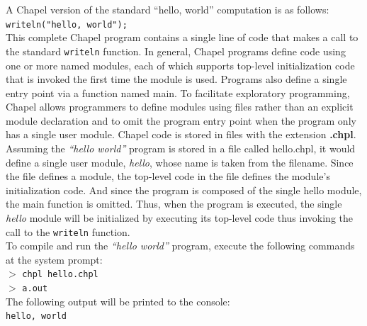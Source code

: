 \documentclass[letterpaper]{article}
\begin{document}
A Chapel version of the standard “hello, world” computation is as follows:\\

\texttt{writeln("hello, world");}\\

This complete Chapel program contains a single line of code that makes a call to the standard
\texttt{writeln} function. In general, Chapel programs define code using one or more named
modules, each of which supports top-level initialization code that is invoked the first time the module is used. Programs also define a single entry point via a function named main. To facilitate exploratory programming, Chapel allows programmers to define modules using files rather than an explicit module declaration and to omit the program entry point when the program only has a single user
module. Chapel code is stored in files with the extension \textbf{.chpl}. Assuming the \textit{“hello world”} program is stored in a file called \textbf{}hello.chpl, it would define a single user module, \textit{hello}, whose name is taken from the filename. Since the file defines a module, the top-level code in the file defines the module’s initialization code. And since the program is composed of the single hello module, the main function is omitted. Thus, when the program is executed, the single \textit{hello} module will be initialized by executing its top-level code thus invoking the call to the
\texttt{writeln} function.\\
To compile and run the \textit{“hello world”} program, execute the following commands at the system prompt:\\
$>$ \texttt{chpl hello.chpl} \\
$>$ \texttt{a.out}\\

The following output will be printed to the console:\\
\texttt{hello, world}


\footnotesize


\end{document}
